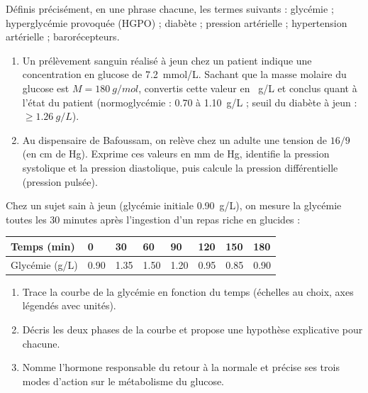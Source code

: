 \documentclass[11pt]{article}
\newcommand{\cle}[1]{{\popxbold\color{popdark}#1}}
\newcounter{popsec}
\newcounter{popsub}
\newcommand{\courssub}[1]{%
  \stepcounter{popsub}%
  \par\vspace{9pt}\noindent{\popxbold\fontsize{11.5}{13}\selectfont\color{popink}{\color{poporange}\thepopsec.\thepopsub}\hspace{6pt}#1}\par\nopagebreak\vspace{4pt}
}
\begin{document}
\begin{exercice}[Définitions]
Définis précisément, en une phrase chacune, les termes suivants : \cle{glycémie} ; \cle{hyperglycémie provoquée} (HGPO) ; \cle{diabète} ; \cle{pression artérielle} ; \cle{hypertension artérielle} ; \cle{barorécepteurs}.
\end{exercice}

\begin{exercice}
\begin{enumerate}
\item Un prélèvement sanguin réalisé à jeun chez un patient indique une concentration en glucose de \SI{7,2}{mmol/L}. Sachant que la masse molaire du glucose est $M = \SI{180}{g/mol}$, convertis cette valeur en \SI{}{g/L} et conclus quant à l'état du patient (normoglycémie : \num{0,70} à \SI{1,10}{g/L} ; seuil du diabète à jeun : $\geq \SI{1,26}{g/L}$).
\item Au dispensaire de Bafoussam, on relève chez un adulte une tension de $16/9$ (en cm de Hg). Exprime ces valeurs en mm de Hg, identifie la pression systolique et la pression diastolique, puis calcule la pression différentielle (pression pulsée).
\end{enumerate}
\end{exercice}

\courssub{Je m'entraîne}

\begin{exercice}
Chez un sujet sain à jeun (glycémie initiale \SI{0,90}{g/L}), on mesure la glycémie toutes les 30 minutes après l'ingestion d'un repas riche en glucides :
\begin{center}
\begin{tabularx}{\linewidth}{|l|X|X|X|X|X|X|X|}\hline
\rowcolor{popblueL} Temps (min) & 0 & 30 & 60 & 90 & 120 & 150 & 180 \\ \hline
Glycémie (g/L) & \num{0,90} & \num{1,35} & \num{1,50} & \num{1,20} & \num{0,95} & \num{0,85} & \num{0,90} \\ \hline
\end{tabularx}
\end{center}
\begin{enumerate}
\item Trace la courbe de la glycémie en fonction du temps (échelles au choix, axes légendés avec unités).
\item Décris les deux phases de la courbe et propose une hypothèse explicative pour chacune.
\item Nomme l'hormone responsable du retour à la normale et précise ses trois modes d'action sur le métabolisme du glucose.
\end{enumerate}
\end{exercice}
\end{document}
